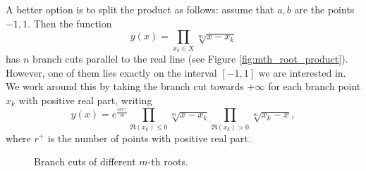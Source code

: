 \documentclass[main.tex]{subfiles}
\begin{document}
  A better option is to split the product as follows:
  assume that $a,b$ are the points $-1,1$. Then the function
  \begin{equation*}
      y(x) = \prod_{x_k\in X}\sqrt[m]{x-x_k}
  \end{equation*}
  has $n$ branch cuts parallel to the real line (see Figure \ref{fig:mth_root_product}).
  However, one of them lies exactly on the interval $[-1,1]$ we are interested in. We work around this
  by taking the branch cut towards $+\infty$ for each branch point $x_k$ with positive real part, writing
  \begin{equation*}
      y(x) = e^{\frac{iπr^+}m}\prod_{\Re(x_k)\leq0}\sqrt[m]{x-x_k} \prod_{\Re(x_k)>0}\sqrt[m]{x_k-x},
  \end{equation*}
  where $r^+$ is the number of points with positive real part.
  
  \begin{figure}[H]
      \begin{center}
      \end{center}
      \caption{Branch cuts of different $m$-th roots.}
  \label{fig:mth_root_pol} \end{figure}
\end{document}
